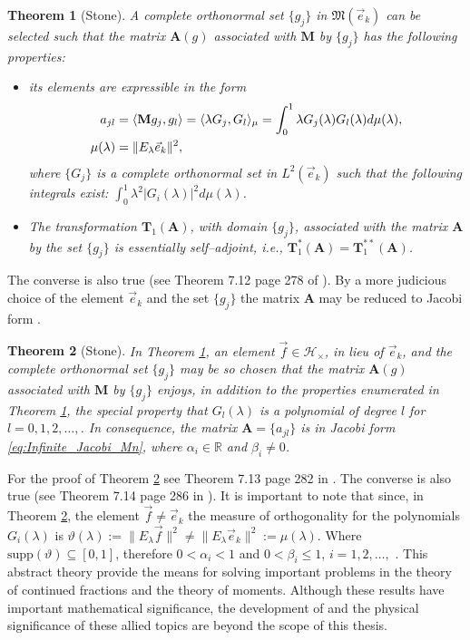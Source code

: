 \documentclass[english,12pt]{ttuthes}
\newtheorem{theorem}{Theorem}[chapter]
\begin{document}
\begin{theorem}[Stone]\label{thm:Matrix_Rep_M}
%
A complete orthonormal set $\{g_j\}$ in $\mathfrak{M}(\vec{e}_k)$
can be selected such that the matrix $\mathbf{A}(g)$ associated with
$\mathbf{M}$ by $\{g_j\}$ has the following properties:
%
\begin{itemize}
%  
\item[(1)] its elements are expressible in the form
%
\begin{align}\label{eq:Matrix_for_M}
  a_{jl}&=\langle\mathbf{M}g_j,g_l\rangle=\langle\lambda G_j,G_l\rangle_\mu=\int_0^1\lambda G_j(\lambda)G_l(\lambda)d\mu(\lambda),\\
  \mu(\lambda)&=\|E_\lambda\vec{e}_k\|^2,\notag  
\end{align}
%
where $\{G_j\}$ is a complete orthonormal set in $L^2(\vec{e}_k)$ such
that the following integrals exist: $\int_0^1\lambda^2|G_i(\lambda)|^2d\mu(\lambda)$.
%
\item[(2)]
%
The transformation $\mathbf{T}_1(\mathbf{A})$, with domain
$\{g_j\}$, associated with the matrix $\mathbf{A}$ by the set
$\{g_j\}$ is essentially self--adjoint, i.e.,
$\mathbf{T}_1^*(\mathbf{A})=\mathbf{T}_1^{**}(\mathbf{A})$.
\end{itemize}
\end{theorem}
The converse is also true (see Theorem 7.12 page 278 of
\cite{Stone:64}). By a more judicious choice of the element
$\vec{e}_k$ and the set $\{g_j\}$ the matrix $\mathbf{A}$ may be reduced
to Jacobi form \cite{Stone:64}. 
%
\begin{theorem}[Stone]\label{thm:Jacobi_Matrix_Rep_M}
  In Theorem \ref{thm:Matrix_Rep_M}, an element
  $\vec{f}\in\mathscr{H}_\times$, in lieu of $\vec{e}_k$, and the complete
  orthonormal set $\{g_j\}$ may be so chosen that the matrix
  $\mathbf{A}(g)$ associated with $\mathbf{M}$ by $\{g_j\}$ enjoys, in
  addition to the properties enumerated in Theorem
  \ref{thm:Matrix_Rep_M}, the special property that $G_l(\lambda)$ is a
  polynomial of degree $l$ for $l=0,1,2,\ldots,$. In consequence, the matrix
  $\mathbf{A}=\{a_{jl}\}$ is in Jacobi form
  \eqref{eq:Infinite_Jacobi_Mn}, where $\alpha_i\in\mathbb{R}$ and $\beta_i\neq0$.  
%
\end{theorem}
%

For the proof of Theorem \ref{thm:Jacobi_Matrix_Rep_M} see Theorem
7.13 page 282 in \cite{Stone:64}. The converse is also true (see   
Theorem 7.14 page 286 in \cite{Stone:64}). It is important to note
that since, in Theorem \ref{thm:Jacobi_Matrix_Rep_M}, the element
$\vec{f}\neq\vec{e}_k$ the measure of orthogonality for the polynomials
$G_i(\lambda)$ is $\vartheta(\lambda):=\|E_\lambda\vec{f}\|^2\neq\|E_\lambda\vec{e}_k\|^2:=\mu(\lambda)$. Where
$\text{supp}(\vartheta)\subseteq[0,1]$, therefore $0<\alpha_i<1$ and $0<\beta_i\leq1$, $i=1,2,\ldots,$
\cite{Gautschi:2004:OP}. This abstract theory provide the means for
solving important problems in the theory of continued fractions and
the theory of moments. Although these results have important
mathematical significance, the development of and the physical
significance of these allied topics are beyond the scope of this
thesis.
%
%
%
%
\end{document}
